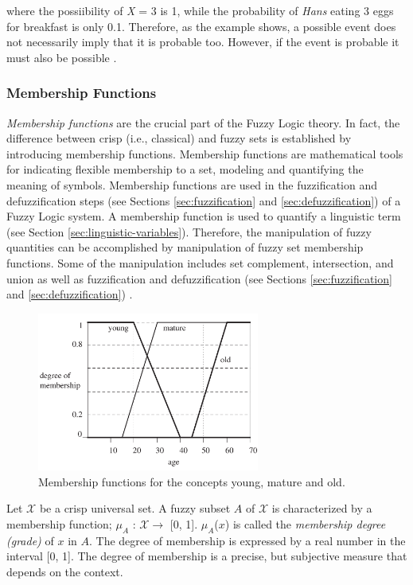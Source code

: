 \documentclass[11pt]{article}
\begin{document}
where the possiibility of \textit{X} = 3 is 1, while the probability of
\textit{Hans} eating 3 eggs for breakfast is only 0.1. Therefore, as the example
shows, a possible event does not necessarily imply that it is probable too.
However, if the event is probable it must also be possible
\cite{zimmermann:fuzzy-sets}.

\subsubsection{Membership Functions}
\label{sec:membership-function}

\textit{Membership functions} are the crucial part of the Fuzzy Logic theory. In
fact, the difference between crisp (i.e., classical) and fuzzy sets is
established by introducing membership functions. Membership functions are
mathematical tools for indicating flexible membership to a set, modeling and
quantifying the meaning of symbols. Membership functions are used in the
fuzzification and defuzzification steps (see Sections \ref{sec:fuzzification}
and \ref{sec:defuzzification}) of a Fuzzy Logic system. A membership function is
used to quantify a linguistic term (see Section \ref{sec:linguistic-variables}).
Therefore, the manipulation of fuzzy quantities can be accomplished by
manipulation of fuzzy set membership functions. Some of the manipulation
includes set complement, intersection, and union as well as fuzzification and
defuzzification (see Sections \ref{sec:fuzzification} and
\ref{sec:defuzzification}) \cite{schalkoff:intelligent-systems}.

\begin{figure}[tbh]
  \center
  \includegraphics[width=0.65\textwidth]{figure/membership-function.png}
  \caption{Membership functions for the concepts young, mature and old.}
  \label{fig:membership-function}
\end{figure}

Let $\mathcal{X}$ be a crisp universal set. A fuzzy subset $\textit{A}$ of
$\mathcal{X}$ is characterized by a membership function; $\mu_A$ : $\mathcal{X}
\rightarrow$ [0, 1]. $\mu_A$($\textit{x}$) is called the \textit{membership
degree (grade)} of $\textit{x}$ in $\textit{A}$. The degree of membership is
expressed by a real number in the interval [0, 1]. The degree of membership is a
precise, but subjective measure that depends on the context.
\end{document}
